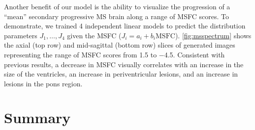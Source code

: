 Another benefit of our model is the ability to visualize the progression of a
``mean'' secondary progressive MS brain along a range of MSFC scores.
To demonstrate, we trained 4 independent linear models to predict the
distribution parameters $J_1, \dotsc, J_4$ given the MSFC ($J_i = a_i +
b_i\text{MSFC}$). \ref{fig:msspectrum} shows the axial (top row) and
mid-sagittal (bottom row) slices of generated images representing the range of
MSFC scores from \num{1.5} to \num{-4.5}. Consistent with previous results, a
decrease in MSFC visually correlates with an increase in the size of the
ventricles, an increase in periventricular lesions, and an increase in lesions
in the pons region.

\section{Summary}


